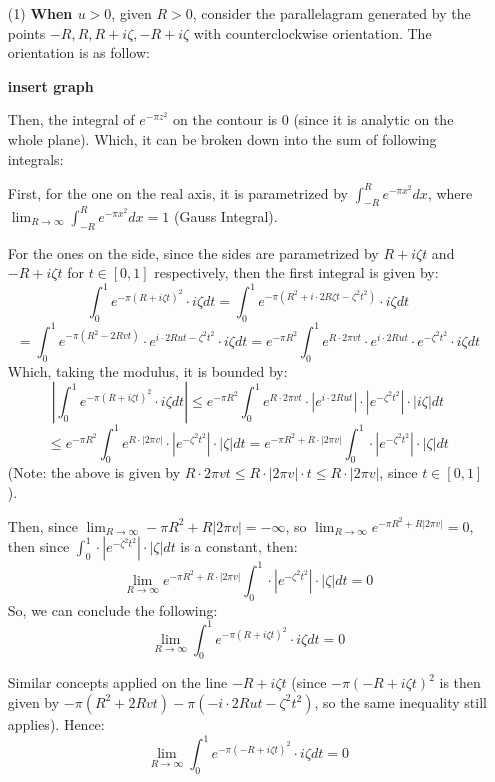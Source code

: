 \documentclass{article}
\begin{document}
\begin{itemize}
    \item[(1)] \textbf{When $u>0$}, given $R>0$, consider the parallelagram generated by the points $-R,R,R+i\zeta,-R+i\zeta$ with counterclockwise orientation. The orientation is as follow:
    
    \textbf{insert graph}

    Then, the integral of $e^{-\pi z^2}$ on the contour is $0$ (since it is analytic on the whole plane). Which, it can be broken down into the sum of following integrals:

    \hfil

    First, for the one on the real axis, it is parametrized by $\int_{-R}^{R}e^{-\pi x^2}dx$, where $\lim_{R\rightarrow\infty}\int_{-R}^{R}e^{-\pi x^2}dx=1$ (Gauss Integral).

    \hfil

    For the ones on the side, since the sides are parametrized by $R+i\zeta t$ and $-R+i\zeta t$ for $t\in[0,1]$ respectively, then the first integral is given by:
    $$\int_{0}^{1}e^{-\pi(R+i\zeta t)^2}\cdot i\zeta dt = \int_{0}^{1}e^{-\pi(R^2+i\cdot 2R\zeta t-\zeta^2t^2)}\cdot i\zeta dt$$
    $$=\int_{0}^{1}e^{-\pi(R^2-2Rvt)}\cdot e^{i\cdot 2Rut-\zeta^2t^2}\cdot i\zeta dt=e^{-\pi R^2}\int_{0}^{1}e^{R\cdot 2\pi vt}\cdot e^{i\cdot 2Rut}\cdot e^{-\zeta^2t^2}\cdot i\zeta dt$$
    Which, taking the modulus, it is bounded by:
    $$\left|\int_{0}^{1}e^{-\pi(R+i\zeta t)^2}\cdot i\zeta dt\right| \leq e^{-\pi R^2}\int_{0}^{1}e^{R\cdot 2\pi vt}\cdot |e^{i\cdot 2Rut}|\cdot |e^{-\zeta^2t^2}|\cdot |i\zeta| dt$$
    $$\leq e^{-\pi R^2}\int_{0}^{1}e^{R\cdot |2\pi v|}\cdot |e^{-\zeta^2t^2}|\cdot |\zeta| dt = e^{-\pi R^2+R\cdot |2\pi v|}\int_{0}^{1}\cdot |e^{-\zeta^2t^2}|\cdot |\zeta| dt$$
    (Note: the above is given by $R\cdot 2\pi vt \leq R\cdot |2\pi v|\cdot t \leq R\cdot|2\pi v|$, since $t\in [0,1]$).

    Then, since $\lim_{R\rightarrow\infty}-\pi R^2+R|2\pi v| = -\infty$, so $\lim_{R\rightarrow\infty}e^{-\pi R^2+R|2\pi v|}=0$, then since $\int_{0}^{1}\cdot |e^{-\zeta^2t^2}|\cdot |\zeta| dt$ is a constant, then:
    $$\lim_{R\rightarrow\infty}e^{-\pi R^2+R\cdot |2\pi v|}\int_{0}^{1}\cdot |e^{-\zeta^2t^2}|\cdot |\zeta| dt = 0$$
    So, we can conclude the following:
    $$\lim_{R\rightarrow\infty}\int_{0}^{1}e^{-\pi(R+i\zeta t)^2}\cdot i\zeta dt = 0$$

    Similar concepts applied on the line $-R+i\zeta t$ (since $-\pi(-R+i\zeta t)^2$ is then given by $-\pi(R^2+2Rvt)-\pi(-i\cdot 2Rut-\zeta^2t^2)$, so the same inequality still applies).
    Hence: 
    $$\lim_{R\rightarrow\infty}\int_{0}^{1}e^{-\pi(-R+i\zeta t)^2}\cdot i\zeta dt = 0$$


\end{itemize}
\end{document}
